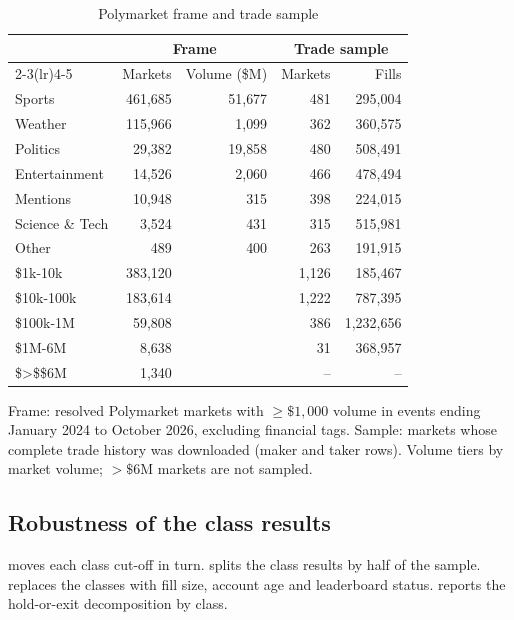 \begin{table}[t]
\centering
\small
\begin{threeparttable}
\caption{Polymarket frame and trade sample}\label{tab:wallets-coverage}
\begin{tabular}{lrrrr}
\toprule
& \multicolumn{2}{c}{Frame} & \multicolumn{2}{c}{Trade sample} \\
\cmidrule(lr){2-3}\cmidrule(lr){4-5}
& Markets & Volume (\$M) & Markets & Fills \\
\midrule
Sports & 461{,}685 & 51{,}677 & 481 & 295{,}004 \\
Weather & 115{,}966 & 1{,}099 & 362 & 360{,}575 \\
Politics & 29{,}382 & 19{,}858 & 480 & 508{,}491 \\
Entertainment & 14{,}526 & 2{,}060 & 466 & 478{,}494 \\
Mentions & 10{,}948 & 315 & 398 & 224{,}015 \\
Science \& Tech & 3{,}524 & 431 & 315 & 515{,}981 \\
Other & 489 & 400 & 263 & 191{,}915 \\
\midrule
\$1k-10k & 383{,}120 & & 1{,}126 & 185{,}467 \\
\$10k-100k & 183{,}614 & & 1{,}222 & 787{,}395 \\
\$100k-1M & 59{,}808 & & 386 & 1{,}232{,}656 \\
\$1M-6M & 8{,}638 & & 31 & 368{,}957 \\
\$>\$\$6M & 1{,}340 & & -- & -- \\
\bottomrule
\end{tabular}
\begin{tablenotes}\footnotesize
\item Frame: resolved Polymarket markets with $\geq\$1{,}000$ volume in events ending January 2024 to October
  2026, excluding financial tags. Sample: markets whose complete trade history was downloaded (maker and
  taker rows). Volume tiers by market volume; $>\$6$M markets are not sampled.
\end{tablenotes}
\end{threeparttable}
\end{table}

\subsection{Robustness of the class results}\label{app:wallets-robust}
 moves each class cut-off in turn.  splits the class results by
half of the sample.  replaces the classes with fill size, account age and
leaderboard status.  reports the hold-or-exit decomposition by class.

